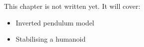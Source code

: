 \label{ch:ctl2}
\begin{keyidea}
This chapter is not written yet. It will cover:
\begin{itemize}[nosep]
  \item Inverted pendulum model
  \item Stabilising a humanoid
\end{itemize}
\end{keyidea}
